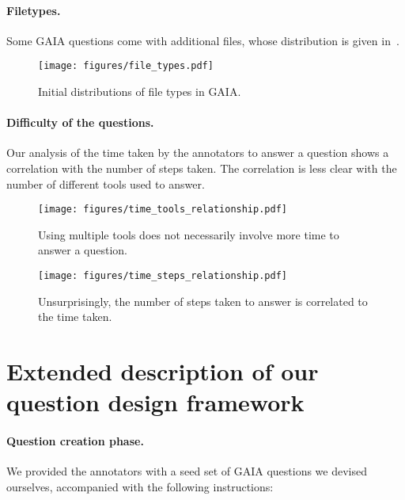 \documentclass{fairmeta}
\newcommand{\benchmark}{\textsc{GAIA}}
\begin{document}
\paragraph{Filetypes.} Some \benchmark{} questions come with additional files, whose distribution is given in~.
\begin{figure}[h!]
    \centering
    \texttt{[image: figures/file\_types.pdf]}
    \caption{Initial distributions of file types in \benchmark{}.}
    \label{fig:file_types}
\end{figure}

\paragraph{Difficulty of the questions.}

Our analysis of the time taken by the annotators to answer a question shows a correlation with the number of steps taken. The correlation is less clear with the number of different tools used to answer.

\begin{figure}[h!]
    \centering
    \begin{minipage}{0.495\textwidth}
        \centering
        \texttt{[image: figures/time\_tools\_relationship.pdf]}
        \caption{Using multiple tools does not necessarily involve more time to answer a question.}
        \label{fig:time_tools}
    \end{minipage}\hfill
    \begin{minipage}{0.495\textwidth}
        \centering
        \texttt{[image: figures/time\_steps\_relationship.pdf]}
        \caption{Unsurprisingly, the number of steps taken to answer is correlated to the time taken.}
        \label{fig:time_steps}
    \end{minipage}
\end{figure}


\section{Extended description of our question design framework}
\label{sec:extended_protocol}

\paragraph{Question creation phase.} We provided the annotators with a seed set of \benchmark{} questions we devised ourselves, accompanied with the following instructions:
\end{document}
